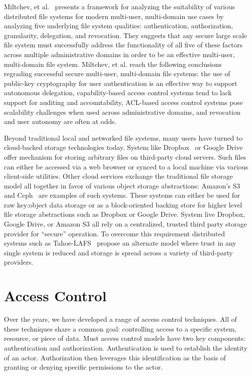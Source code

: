 Miltchev, et al.~\cite{miltchev2008} presents a framework for
analyzing the suitability of various distributed file systems for
modern multi-user, multi-domain use cases by analyzing five underlying
file system qualities: authentication, authorization, granularity,
delegation, and revocation. They suggests that any secure large scale
file system must successfully address the functionality of all five of
these factors across multiple administrative domains in order to be an
effective multi-user, multi-domain file system. Miltchev, et al. reach
the following conclusions regrading successful secure multi-user,
multi-domain file systems: the use of public-key cryptography for user
authentication is an effective way to support autonomous delegation,
capability-based access control systems tend to lack support for
auditing and accountability, ACL-based access control systems pose
scalability challenges when used across administrative domains, and
revocation and user autonomy are often at odds.

Beyond traditional local and networked file systems, many users have
turned to cloud-backed storage technologies today. System like
Dropbox~\cite{dropbox} or Google Drive~\cite{google-drive} offer
mechanism for storing arbitrary files on third-party cloud
servers. Such files can either be accessed via a web browser or synced
to a local machine via various client-side utilities. Other cloud
services exchange the traditional file storage model all together in
favor of various object storage abstractions: Amazon's
S3~\cite{amazon-s3} and Ceph~\cite{ceph} are examples of such
systems. These systems can either be used for raw key:object data
storage or as a block-oriented backing store for higher level file
storage abstractions such as Dropbox or Google Drive. System live
Dropbox, Google Drive, or Amazon S3 all rely on a centralized, trusted
third party storage provider for ``secure'' operation. To overcome
this requirement distributed systems such as
Tahoe-LAFS~\cite{wilcox-o'hearn2008} propose an alternate model where
trust in any single system is reduced and storage is spread across a
variety of third-party providers.

\section{Access Control}
\label{chap:background:ac}

Over the years, we have developed a range of access control
techniques. All of these techniques share a common goal: controlling
access to a specific system, resource, or piece of data. Must access
control models have two key components: authentication and
authorization.  Authentication is used to establish the identity of an
actor. Authorization then leverages this identification as the basis
of granting or denying specific permissions to the actor.

